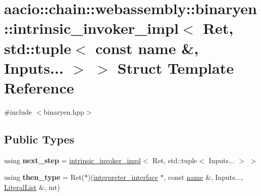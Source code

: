 \hypertarget{structaacio_1_1chain_1_1webassembly_1_1binaryen_1_1intrinsic__invoker__impl_3_01_ret_00_01std_1_5163181577c78115845d25e4011d3b90}{}\section{aacio\+:\+:chain\+:\+:webassembly\+:\+:binaryen\+:\+:intrinsic\+\_\+invoker\+\_\+impl$<$ Ret, std\+:\+:tuple$<$ const name \&, Inputs... $>$ $>$ Struct Template Reference}
\label{structaacio_1_1chain_1_1webassembly_1_1binaryen_1_1intrinsic__invoker__impl_3_01_ret_00_01std_1_5163181577c78115845d25e4011d3b90}


{\ttfamily \#include $<$binaryen.\+hpp$>$}

\subsection*{Public Types}
\begin{DoxyCompactItemize}
\item 
\mbox{\label{structaacio_1_1chain_1_1webassembly_1_1binaryen_1_1intrinsic__invoker__impl_3_01_ret_00_01std_1_5163181577c78115845d25e4011d3b90_ab8a18f2aa34b1496dfff7bcd46088418}} 
using {\bfseries next\+\_\+step} = \mbox{\hyperlink{structaacio_1_1chain_1_1webassembly_1_1binaryen_1_1intrinsic__invoker__impl}{intrinsic\+\_\+invoker\+\_\+impl}}$<$ Ret, std\+::tuple$<$ Inputs... $>$ $>$
\item 
\mbox{\label{structaacio_1_1chain_1_1webassembly_1_1binaryen_1_1intrinsic__invoker__impl_3_01_ret_00_01std_1_5163181577c78115845d25e4011d3b90_a175ac2ee09f31b52d7544b3e580e0e49}} 
using {\bfseries then\+\_\+type} = Ret($\ast$)(\mbox{\hyperlink{structaacio_1_1chain_1_1webassembly_1_1binaryen_1_1interpreter__interface}{interpreter\+\_\+interface}} $\ast$, const \mbox{\hyperlink{structaacio_1_1chain_1_1name}{name}} \&, Inputs..., \mbox{\hyperlink{classstd_1_1vector}{Literal\+List}} \&, int)
\end{DoxyCompactItemize}
